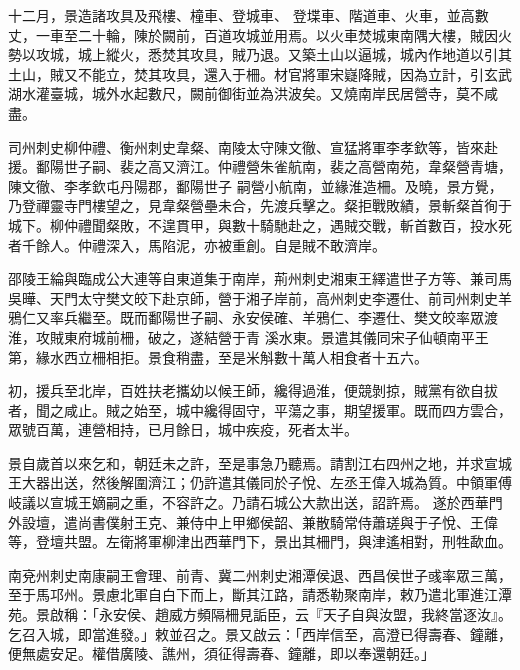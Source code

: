 \begin{pinyinscope}
 十二月，景造諸攻具及飛樓、橦車、登城車、
 登堞車、階道車、火車，並高數丈，一車至二十輪，陳於闕前，百道攻城並用焉。以火車焚城東南隅大樓，賊因火勢以攻城，城上縱火，悉焚其攻具，賊乃退。又築土山以逼城，城內作地道以引其土山，賊又不能立，焚其攻具，還入于柵。材官將軍宋嶷降賊，因為立計，引玄武湖水灌臺城，城外水起數尺，闕前御街並為洪波矣。又燒南岸民居營寺，莫不咸盡。



 司州刺史柳仲禮、衡州刺史韋粲、南陵太守陳文徹、宣猛將軍李孝欽等，皆來赴援。鄱陽世子嗣、裴之高又濟江。仲禮營朱雀航南，裴之高營南苑，韋粲營青塘，陳文徹、李孝欽屯丹陽郡，鄱陽世子
 嗣營小航南，並緣淮造柵。及曉，景方覺，乃登禪靈寺門樓望之，見韋粲營壘未合，先渡兵擊之。粲拒戰敗績，景斬粲首徇于城下。柳仲禮聞粲敗，不遑貫甲，與數十騎馳赴之，遇賊交戰，斬首數百，投水死者千餘人。仲禮深入，馬陷泥，亦被重創。自是賊不敢濟岸。



 邵陵王綸與臨成公大連等自東道集于南岸，荊州刺史湘東王繹遣世子方等、兼司馬吳曄、天門太守樊文皎下赴京師，營于湘子岸前，高州刺史李遷仕、前司州刺史羊鴉仁又率兵繼至。既而鄱陽世子嗣、永安侯確、羊鴉仁、李遷仕、樊文皎率眾渡淮，攻賊東府城前柵，破之，遂結營于青
 溪水東。景遣其儀同宋子仙頓南平王第，緣水西立柵相拒。景食稍盡，至是米斛數十萬人相食者十五六。



 初，援兵至北岸，百姓扶老攜幼以候王師，纔得過淮，便競剝掠，賊黨有欲自拔者，聞之咸止。賊之始至，城中纔得固守，平蕩之事，期望援軍。既而四方雲合，眾號百萬，連營相持，已月餘日，城中疾疫，死者太半。



 景自歲首以來乞和，朝廷未之許，至是事急乃聽焉。請割江右四州之地，并求宣城王大器出送，然後解圍濟江；仍許遣其儀同於子悅、左丞王偉入城為質。中領軍傅岐議以宣城王嫡嗣之重，不容許之。乃請石城公大款出送，詔許焉。
 遂於西華門外設壇，遣尚書僕射王克、兼侍中上甲鄉侯韶、兼散騎常侍蕭瑳與于子悅、王偉等，登壇共盟。左衛將軍柳津出西華門下，景出其柵門，與津遙相對，刑牲歃血。



 南兗州刺史南康嗣王會理、前青、冀二州刺史湘潭侯退、西昌侯世子彧率眾三萬，至于馬邛州。景慮北軍自白下而上，斷其江路，請悉勒聚南岸，敕乃遣北軍進江潭苑。景啟稱：「永安侯、趙威方頻隔柵見詬臣，云『天子自與汝盟，我終當逐汝』。乞召入城，即當進發。」敕並召之。景又啟云：「西岸信至，高澄已得壽春、鐘離，便無處安足。權借廣陵、譙州，須征得壽春、鐘離，即以奉還朝廷。」




\end{pinyinscope}
